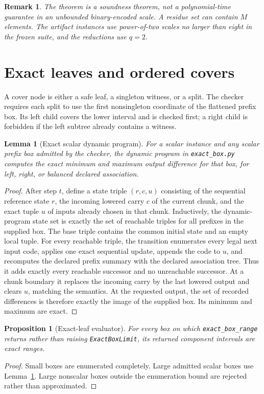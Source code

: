 \documentclass[11pt]{article}
\newtheorem{lemma}[definition]{Lemma}
\newtheorem{proposition}[definition]{Proposition}
\newtheorem{remark}[definition]{Remark}
\begin{document}
\begin{remark}
The theorem is a soundness theorem, not a polynomial-time guarantee in an unbounded binary-encoded scale. A residue set can contain $M$ elements. The artifact instances use power-of-two scales no larger than eight in the frozen suite, and the reductions use $q=2$.
\end{remark}

\section{Exact leaves and ordered covers}
A cover node is either a safe leaf, a singleton witness, or a split. The checker requires each split to use the first nonsingleton coordinate of the flattened prefix box. Its left child covers the lower interval and is checked first; a right child is forbidden if the left subtree already contains a witness.

\begin{lemma}[Exact scalar dynamic program]\label{lem:dp}
For a scalar instance and any scalar prefix box admitted by the checker, the dynamic program in \texttt{exact\_box.py} computes the exact minimum and maximum output difference for that box, for left, right, or balanced declared association.
\end{lemma}
\begin{proof}
After step $t$, define a state triple $(r,c,u)$ consisting of the sequential reference state $r$, the incoming lowered carry $c$ of the current chunk, and the exact tuple $u$ of inputs already chosen in that chunk. Inductively, the dynamic-program state set is exactly the set of reachable triples for all prefixes in the supplied box. The base triple contains the common initial state and an empty local tuple. For every reachable triple, the transition enumerates every legal next input code, applies one exact sequential update, appends the code to $u$, and recomputes the declared prefix summary with the declared association tree. Thus it adds exactly every reachable successor and no unreachable successor. At a chunk boundary it replaces the incoming carry by the last lowered output and clears $u$, matching the semantics. At the requested output, the set of recorded differences is therefore exactly the image of the supplied box. Its minimum and maximum are exact.
\end{proof}

\begin{proposition}[Exact-leaf evaluator]\label{prop:leaf}
For every box on which \texttt{exact\_box\_range} returns rather than raising \texttt{ExactBoxLimit}, its returned component intervals are exact ranges.
\end{proposition}
\begin{proof}
Small boxes are enumerated completely. Large admitted scalar boxes use Lemma~\ref{lem:dp}. Large nonscalar boxes outside the enumeration bound are rejected rather than approximated.
\end{proof}
\end{document}
